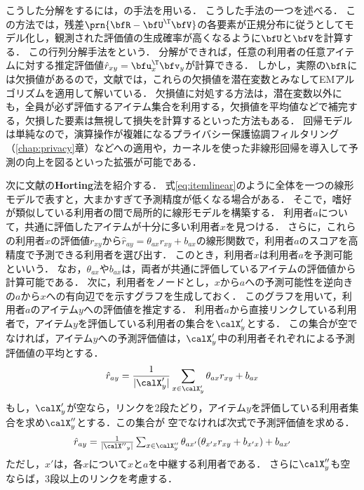こうした分解をするには，の手法を用いる．
こうした手法の一つ\cite{sigir:02:01}を述べる．
この方法では，残差$\prn{\bfR-\bfU^\T\bfV}$の各要素が正規分布に従うとしてモデル化し，観測された評価値の生成確率が高くなるように$\bfU$と$\bfV$を計算する．
この行列分解手法をという．
分解ができれば，任意の利用者の任意アイテムに対する推定評価値$\hat{r}_{xy}=\bfu_x^\T \bfv_y$が計算できる．
しかし，実際の$\bfR$には欠損値があるので，文献\cite{sigir:02:01}では，これらの欠損値を潜在変数とみなしてEMアルゴリズム\cite{jrss:77:01}を適用して解いている．
欠損値に対処する方法は，潜在変数以外にも，全員が必ず評価するアイテム集合を利用する，欠損値を平均値などで補完する，欠損した要素は無視して損失を計算する\cite{kdd:07:01}といった方法もある．
回帰モデルは単純なので，演算操作が複雑になるプライバシー保護協調フィルタリング（\ref{chap:privacy}章）などへの適用や，カーネルを使った非線形回帰を導入して予測の向上を図るといった拡張が可能である．

次に文献\cite{kdd:99:04}の\textbf{Horting}法を紹介する．
式\eqref{eq:itemlinear}のように全体を一つの線形モデルで表すと，大まかすぎて予測精度が低くなる場合がある．
そこで，嗜好が類似している利用者の間で局所的に線形モデルを構築する．
利用者$a$について，共通に評価したアイテムが十分に多い利用者$x$を見つける．
さらに，これらの利用者$x$の評価値$r_{xy}$から$\hat{r}_{ay}=\theta_{ax}r_{xy} + b_{ax}$の線形関数で，利用者$a$のスコアを高精度で予測できる利用者を選び出す．
このとき，利用者$x$は利用者$a$を予測可能といいう．
なお，$\theta_{ax}$や$b_{ax}$は，両者が共通に評価しているアイテムの評価値から計算可能である．
次に，利用者をノードとし，$x$から$a$への予測可能性を逆向きの$a$から$x$への有向辺でを示すグラフを生成しておく．
このグラフを用いて，利用者$a$のアイテム$y$への評価値を推定する．
利用者$a$から直接リンクしている利用者で，アイテム$y$を評価している利用者の集合を$\calX'_y$とする．
この集合が空でなければ，アイテム$y$への予測評価値は，$\calX'_y$中の利用者それぞれによる予測評価値の平均とする．
\[
 \hat{r}_{ay}=\frac{1}{|\calX'_y|}
\sum_{x\in\calX'_y}\theta_{ax}r_{xy} + b_{ax}
\]
もし，$\calX'_y$が空なら，リンクを2段たどり，アイテム$y$を評価している利用者集合を求め$\calX''_y$とする．この集合が
空でなければ次式で予測評価値を求める．
\[
\textstyle
 \hat{r}_{ay}=\frac{1}{|{\calX''}_y|}\sum_{x\in\calX''_y}\theta_{ax'}(\theta_{x'x}r_{xy} + b_{x'x}) + b_{ax'} 
\]
ただし，$x'$は，各$x$について$x$と$a$を中継する利用者である．
さらに$\calX''_y$も空ならば，3段以上のリンクを考慮する．

